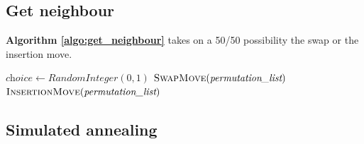 \newpage
\subsection{Get neighbour}

\textbf{Algorithm \ref{algo:get_neighbour}} takes on a 50/50 possibility the swap or the insertion move.

\begin{algorithm}[H]
\caption{Get neighbour}
\label{algo:get_neighbour}
\begin{algorithmic}[1]

    \Statex
        \Statex
        \State $\textit{choice} \gets \textit{RandomInteger}(0, 1)$
        \Statex
            \State \Return $\text{\textsc{SwapMove}}(\textit{permutation\_list})$
        \Else
            \State \Return $\text{\textsc{InsertionMove}}(\textit{permutation\_list})$
        \EndIf
    \EndFunction

\end{algorithmic}
\end{algorithm}

\subsection{Simulated annealing}

